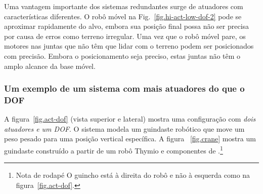 {%

Uma vantagem importante dos sistemas redundantes surge de atuadores com características diferentes. O robô móvel na Fig.~\ref{fig.hi-act-low-dof-2} pode se aproximar rapidamente do alvo, embora sua posição final possa não ser precisa por causa de erros como terreno irregular. Uma vez que o robô móvel pare, os motores nas juntas que não têm que lidar com o terreno podem ser posicionados com precisão. Embora o posicionamento seja preciso, estas juntas não têm o amplo alcance da base móvel.

\subsubsection*{Um exemplo de um sistema com mais atuadores do que o DOF}

A figura~\ref{fig.act-dof} (vista superior e lateral) mostra uma configuração com \emph{dois atuadores e um DOF}. O sistema modela um guindaste robótico que move um peso pesado para uma posição vertical específica. A figura ~\ref{fig.crane} mostra um guindaste construído a partir de um robô Thymio e componentes de \lego.\footnote{Nota de rodapé O guincho está à direita do robô e não à esquerda como na figura~\ref{fig.act-dof}.}

}
